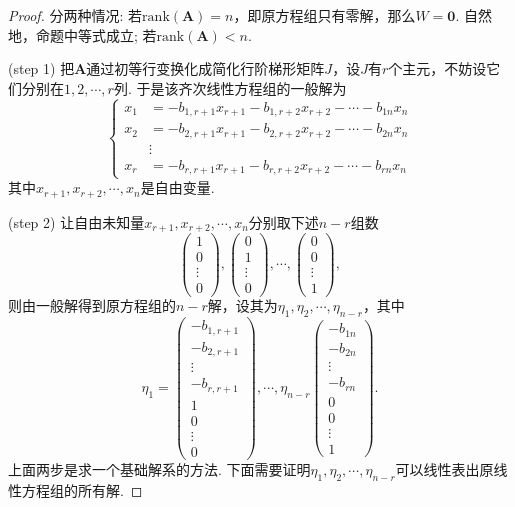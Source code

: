 \documentclass{article}
\newcommand{\mbf}[1]{\bm{#1}}
\newcommand{\rank}[1]{\text{rank}\left(#1\right)} %
\begin{document}
\begin{proof}
分两种情况: 若$\rank{\mbf{A}} = n$，即原方程组只有零解，那么$W = {\mbf{0}}$. 自然地，命题中等式成立; 若$\rank{\mbf{A}} < n$.

(step 1) 把$\mbf{A}$通过初等行变换化成简化行阶梯形矩阵$J$，设$J$有$r$个主元，不妨设它们分别在$1,2,\cdots,r$列. 于是该齐次线性方程组的一般解为
$$
\left\{
\begin{array}{ll}
x_1 &= -b_{1,r+1}x_{r+1} - b_{1,r+2}x_{r+2} - \cdots - b_{1n} x_{n} \\
x_2 &= -b_{2,r+1}x_{r+1} - b_{2,r+2}x_{r+2} - \cdots - b_{2n} x_{n} \\
&\vdots \\
x_r &= -b_{r,r+1}x_{r+1} - b_{r,r+2}x_{r+2} - \cdots - b_{rn} x_{n}
\end{array}
\right.
$$
其中$x_{r+1},x_{r+2},\cdots,x_{n}$是自由变量.

(step 2) 让自由未知量$x_{r+1},x_{r+2},\cdots,x_{n}$分别取下述$n-r$组数
$$
\begin{pmatrix}
1 \\
0 \\
\vdots \\
0
\end{pmatrix},
\begin{pmatrix}
0 \\
1 \\
\vdots \\
0
\end{pmatrix},
\cdots,
\begin{pmatrix}
0 \\
0 \\
\vdots \\
1
\end{pmatrix},
$$
则由一般解得到原方程组的$n-r$解，设其为$\eta_1,\eta_2,\cdots,\eta_{n-r}$，其中
$$
\eta_1 = 
\begin{pmatrix}
-b_{1,r+1}\\
-b_{2,r+1}\\
\vdots\\
-b_{r,r+1}\\
1 \\
0 \\
\vdots \\
0
\end{pmatrix},
\cdots,
\eta_{n-r}
\begin{pmatrix}
-b_{1n}\\
-b_{2n}\\
\vdots\\
-b_{rn}\\
0 \\
0 \\
\vdots \\
1
\end{pmatrix}.
$$
上面两步是求一个基础解系的方法. 下面需要证明$\eta_1,\eta_2,\cdots,\eta_{n-r}$可以线性表出原线性方程组的所有解.
\end{proof}
\end{document}
